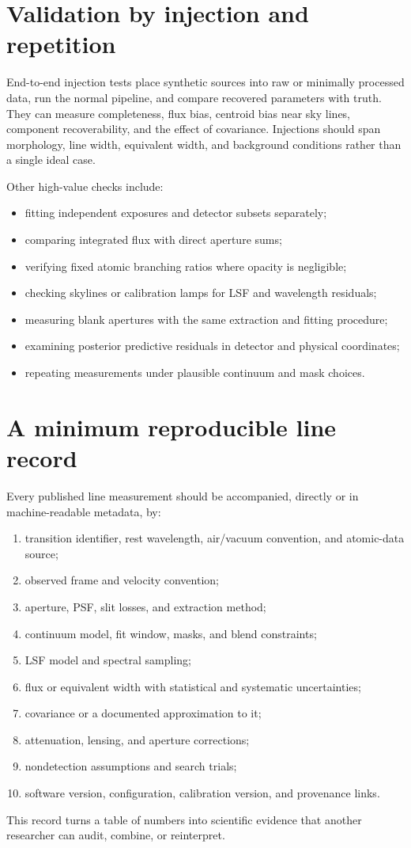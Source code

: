 \section{Validation by injection and repetition}

End-to-end injection tests place synthetic sources into raw or minimally processed
data, run the normal pipeline, and compare recovered parameters with truth.  They can
measure completeness, flux bias, centroid bias near sky lines, component
recoverability, and the effect of covariance.  Injections should span morphology,
line width, equivalent width, and background conditions rather than a single ideal
case.

Other high-value checks include:
\begin{itemize}
 \item fitting independent exposures and detector subsets separately;
 \item comparing integrated flux with direct aperture sums;
 \item verifying fixed atomic branching ratios where opacity is negligible;
 \item checking skylines or calibration lamps for LSF and wavelength residuals;
 \item measuring blank apertures with the same extraction and fitting procedure;
 \item examining posterior predictive residuals in detector and physical coordinates;
 \item repeating measurements under plausible continuum and mask choices.
\end{itemize}

\section{A minimum reproducible line record}

Every published line measurement should be accompanied, directly or in machine-readable
metadata, by:
\begin{enumerate}
 \item transition identifier, rest wavelength, air/vacuum convention, and atomic-data
 source;
 \item observed frame and velocity convention;
 \item aperture, PSF, slit losses, and extraction method;
 \item continuum model, fit window, masks, and blend constraints;
 \item LSF model and spectral sampling;
 \item flux or equivalent width with statistical and systematic uncertainties;
 \item covariance or a documented approximation to it;
 \item attenuation, lensing, and aperture corrections;
 \item nondetection assumptions and search trials;
 \item software version, configuration, calibration version, and provenance links.
\end{enumerate}
This record turns a table of numbers into scientific evidence that another researcher
can audit, combine, or reinterpret.

